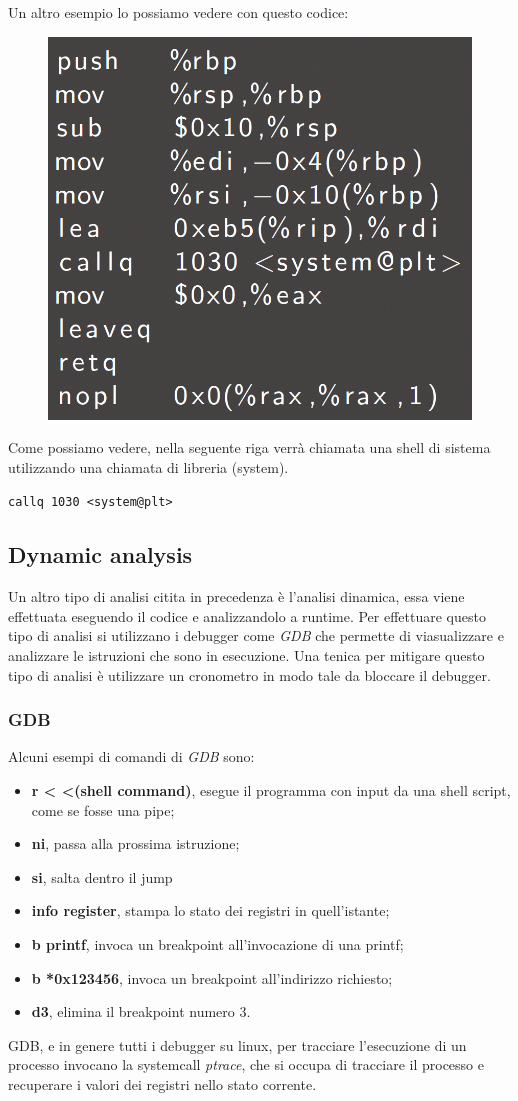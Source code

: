 \begin{ex}
    Un altro esempio lo possiamo vedere con questo codice: 
    \begin{figure}[h!]
        \centering
        \includegraphics[width=.4\linewidth]{res/example_x86_code2.png}
        \caption{}
    \end{figure}
    Come possiamo vedere, nella seguente riga verrà chiamata una shell di sistema utilizzando una chiamata di libreria (system).
    \begin{lstlisting}[language={[x86masm]Assembler}]
        callq 1030 <system@plt>
    \end{lstlisting}
\end{ex}

\subsection{Dynamic analysis}
Un altro tipo di analisi citita in precedenza è l'analisi dinamica, essa viene effettuata eseguendo il codice e analizzandolo a runtime.
Per effettuare questo tipo di analisi si utilizzano i debugger come \textit{GDB} che permette di viasualizzare e analizzare le istruzioni che sono in esecuzione.
Una tenica per mitigare questo tipo di analisi è utilizzare un cronometro in modo tale da bloccare il debugger.

\subsubsection{GDB}
Alcuni esempi di comandi di \textit{GDB} sono:
\begin{itemize}
    \item \textbf{r < <(shell command)}, esegue il programma con input da una shell script, come se fosse una pipe;
    \item \textbf{ni}, passa alla prossima istruzione;
    \item \textbf{si}, salta dentro il jump
    \item \textbf{info register}, stampa lo stato dei registri in quell'istante;
    \item \textbf{b printf}, invoca un breakpoint all'invocazione di una printf;
    \item \textbf{b *0x123456}, invoca un breakpoint all'indirizzo richiesto;
    \item \textbf{d3}, elimina il breakpoint numero 3. 
\end{itemize}
GDB, e in genere tutti i debugger su linux, per tracciare l'esecuzione di un processo invocano la systemcall \textit{ptrace}, che si occupa di tracciare il processo e recuperare i valori dei registri nello stato corrente.

